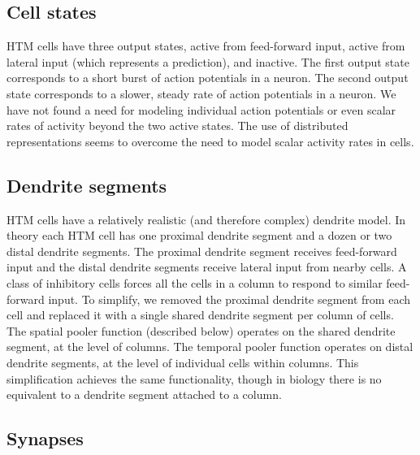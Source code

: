 \documentclass{report}
\begin{document}
\subsection*{Cell states}

HTM cells have three output states, active from feed-forward input,
active from lateral input (which represents a prediction), and
inactive. The first output state corresponds to a short burst of
action potentials in a neuron. The second output state corresponds to
a slower, steady rate of action potentials in a neuron. We have not
found a need for modeling individual action potentials or even scalar
rates of activity beyond the two active states. The use of distributed
representations seems to overcome the need to model scalar activity
rates in cells.

\subsection*{Dendrite segments}

HTM cells have a relatively realistic (and therefore complex) dendrite
model. In theory each HTM cell has one proximal dendrite segment and a
dozen or two distal dendrite segments. The proximal dendrite segment
receives feed-forward input and the distal dendrite segments receive
lateral input from nearby cells. A class of inhibitory cells forces
all the cells in a column to respond to similar feed-forward input. To
simplify, we removed the proximal dendrite segment from each cell and
replaced it with a single shared dendrite segment per column of
cells. The spatial pooler function (described below) operates on the
shared dendrite segment, at the level of columns. The temporal pooler
function operates on distal dendrite segments, at the level of
individual cells within columns. This simplification achieves the same
functionality, though in biology there is no equivalent to a dendrite
segment attached to a column.

\subsection*{Synapses}
\end{document}
